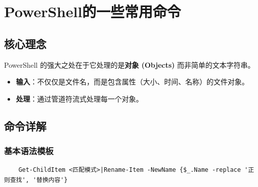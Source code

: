 \documentclass[CJKmath=true,10pt]{MyBook}
\begin{document}
\mainmatter

\chapter{PowerShell的一些常用命令}
\section{核心理念}
PowerShell 的强大之处在于它处理的是\textbf{对象 (Objects)} 而非简单的文本字符串。
\begin{itemize}
	\item \textbf{输入}：不仅仅是文件名，而是包含属性（大小、时间、名称）的文件对象。
	\item \textbf{处理}：通过管道符流式处理每一个对象。
\end{itemize}

\section{命令详解}

\subsection{基本语法模板}
\begin{lstlisting}
	Get-ChildItem <匹配模式>|Rename-Item -NewName {$_.Name -replace '正则查找', '替换内容'}
\end{lstlisting}
\end{document}
